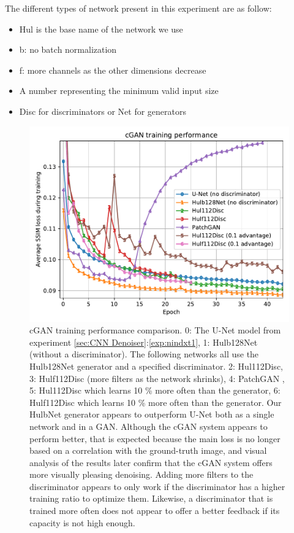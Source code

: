 The different types of network present in this experiment are as follow:
\begin{itemize}
  \item Hul is the base name of the network we use
  \item b: no batch normalization
  \item f: more channels as the other dimensions decrease
  \item A number representing the minimum valid input size
  \item Disc for discriminators or Net for generators
\end{itemize}

\begin{figure}[!htbp]
\centering
\includegraphics[width=1\linewidth]{gfx/graphs/cgan-comp.pdf}
\caption[cGAN learning curve]{
cGAN training performance comparison. 0: The U-Net model from experiment \ref{sec:CNN Denoiser}:\ref{exp:nindxt1}, 1: Hulb128Net (without a discriminator). The following networks all use the Hulb128Net generator and a specified discriminator. 2: Hul112Disc, 3: Hulf112Disc (more filters as the network shrinks), 4: PatchGAN \cite{pix2pix}, 5: Hul112Disc which learns 10 \% more often than the generator, 6: Hulf112Disc which learns 10 \% more often than the generator.
Our HulbNet generator appears to outperform U-Net both as a single network and in a \acs{GAN}. Although the \acs{cGAN} system appears to perform better, that is expected because the main loss is no longer based on a correlation with the ground-truth image, and visual analysis of the results later confirm that the \acs{cGAN} system offers more visually pleasing denoising. Adding more filters to the discriminator appears to only work if the discriminator has a higher training ratio to optimize them. Likewise, a discriminator that is trained more often does not appear to offer a better feedback if its capacity is not high enough.}
\label{fig:cgan-comp}
\end{figure}

